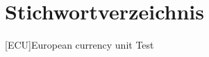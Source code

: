 \section*{Stichwortverzeichnis}
\label{sec:Stichwortverzeichnis}
\begin{acronym}
    [ECU]{European currency unit} Test
\end{acronym}